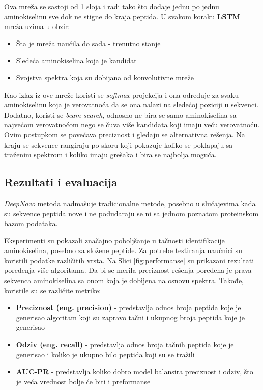 \documentclass[12pt,oneside]{memoir}
\begin{document}
Ova mreža se sastoji od 1 sloja i radi tako što dodaje jednu po jednu aminokiselinu sve dok ne stigne do kraja peptida. U svakom koraku \textbf{LSTM} mreža uzima u obzir:
\begin{itemize}
    \item Šta je mreža naučila do sada - trenutno stanje
    \item Sledeća aminokiselina koja je kandidat
    \item Svojstva spektra koja su dobijana od konvolutivne mreže
\end{itemize}

Kao izlaz iz ove mreže koristi se \emph{softmax} projekcija i ona određuje za svaku aminokiselinu koja je verovatnoća da se ona nalazi na sledećoj poziciji u sekvenci. Dodatno, koristi se \emph{beam search}, odnosno ne bira se samo aminokiselina sa najvećom verovatnoćom nego se čuva više kandidata koji imaju veću verovatnoću. Ovim postupkom se povećava preciznost i gledaju se alternativna rešenja. Na kraju se sekvence rangiraju po skoru koji pokazuje koliko se poklapaju sa traženim spektrom i koliko imaju grešaka i bira se najbolja moguća.

\subsection{Rezultati i evaluacija}

\emph{DeepNovo} metoda nadmašuje tradicionalne metode, posebno u slučajevima kada su sekvence peptida nove i ne podudaraju se ni sa jednom poznatom proteinskom bazom podataka.

Eksperimenti su pokazali značajno poboljšanje u tačnosti identifikacije aminokiselina, posebno za složene peptide. Za potrebe testiranja naučnici su koristili podatke različitih vrsta. Na Slici \ref{fig:performanse} su prikazani rezultati poređenja više algoritama. Da bi se merila preciznost rešenja poređena je prava sekvenca aminokiselina sa onom koja je dobijena na osnovu spektra. 
Takođe, koristile su se različite metrike:
\begin{itemize}
    \item \textbf{Preciznost (eng. precision)} - predstavlja odnos broja peptida koje je generisao algoritam koji su zapravo tačni i ukupnog broja peptida koje je generisao
    \item \textbf{Odziv (eng. recall)} - predstavlja  odnos broja tačnih peptida koje je generisao i koliko je ukupno bilo peptida koji su se tražili
    \item \textbf{AUC-PR} - predstavlja koliko dobro model balansira preciznost i odziv, što je veća vrednost bolje će biti i preformanse
\end{itemize}
\end{document}
